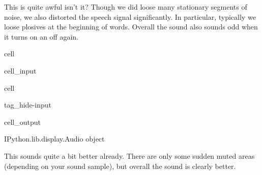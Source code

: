 \documentclass[letterpaper,10pt,english]{jupyterBook}
\begin{document}
\sphinxAtStartPar
This is quite awful isn’t it? Though we did loose many stationary segments of noise, we also distorted the speech signal significantly. In particular, typically we loose plosives at the beginning of words. Overall the sound also sounds odd when it turns on an off again.

\begin{sphinxuseclass}{cell}\begin{sphinxVerbatimInput}

\begin{sphinxuseclass}{cell_input}
\begin{sphinxVerbatim}[commandchars=\\\{\}]
  
  

  \PYG{p}{[}\PYG{p}{]}
   
      
    \PYG{p}{[}\PYG{p}{]}  \PYG{p}{[}\PYG{p}{]}
\end{sphinxVerbatim}

\end{sphinxuseclass}\end{sphinxVerbatimInput}

\end{sphinxuseclass}
\begin{sphinxuseclass}{cell}
\begin{sphinxuseclass}{tag_hide-input}\begin{sphinxVerbatimOutput}

\begin{sphinxuseclass}{cell_output}
\noindent{}

\begin{sphinxVerbatim}[commandchars=\\\{\}]
\PYGZlt{}IPython.lib.display.Audio object\PYGZgt{}
\end{sphinxVerbatim}

\end{sphinxuseclass}\end{sphinxVerbatimOutput}

\end{sphinxuseclass}
\end{sphinxuseclass}
\sphinxAtStartPar
This sounds quite a bit better already. There are only some sudden muted areas (depending on your sound sample), but overall the sound is clearly better.
\end{document}
